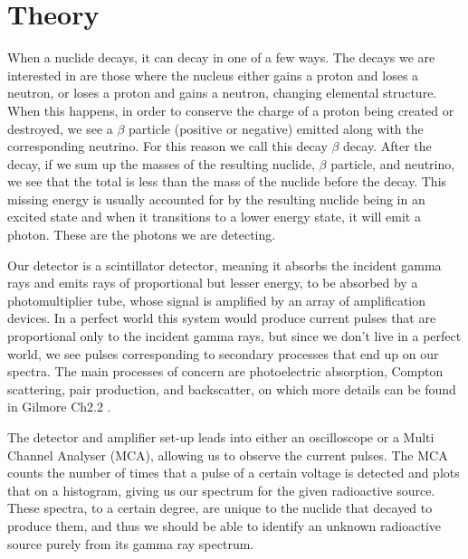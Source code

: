 \documentclass[11pt]{article}
\numberwithin{equation}{section}
\numberwithin{figure}{section}
\numberwithin{table}{section}
\begin{document}
    \section{Theory}\label{sec:Theory}
    \par When a nuclide decays, it can decay in one of a few ways. The decays we are interested in are those where the nucleus either gains a proton and loses a neutron, or loses a proton and gains a neutron, changing elemental structure. When this happens, in order to conserve the charge of a proton being created or destroyed, we see a $\beta$ particle (positive or negative) emitted along with the corresponding neutrino. For this reason we call this decay $\beta$ decay. After the decay, if we sum up the masses of the resulting nuclide, $\beta$ particle, and neutrino, we see that the total is less than the mass of the nuclide before the decay. This missing energy is usually accounted for by the resulting nuclide being in an excited state and when it transitions to a lower energy state, it will emit a photon. These are the photons we are detecting.
    \par Our detector is a scintillator detector, meaning it absorbs the incident gamma rays and emits rays of proportional but lesser energy, to be absorbed by a photomultiplier tube, whose signal is amplified by an array of amplification devices. In a perfect world this system would produce current pulses that are proportional only to the incident gamma rays, but since we don't live in a perfect world, we see pulses corresponding to secondary processes that end up on our spectra. The main processes of concern are photoelectric absorption, Compton scattering, pair production, and backscatter, on which more details can be found in Gilmore Ch2.2 \cite{gilmore}. 
    \par The detector and amplifier set-up leads into either an oscilloscope or a Multi Channel Analyser (MCA), allowing us to observe the current pulses. The MCA counts the number of times that a pulse of a certain voltage is detected and plots that on a histogram, giving us our  spectrum for the given radioactive source. These spectra, to a certain degree, are unique to the nuclide that decayed to produce them, and thus we should be able to identify an unknown radioactive source purely from its gamma ray spectrum.
\end{document}
